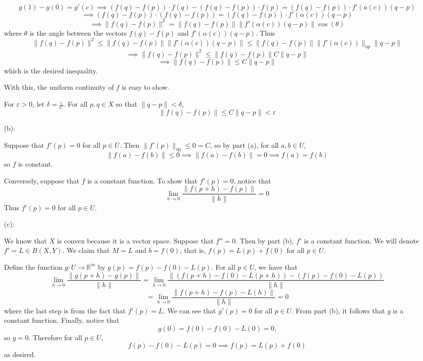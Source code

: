 \documentclass{article}
\newcommand{\op}{\mathrm{op}}
\theoremstyle{plain} %
\numberwithin{thm}{section} %
\theoremstyle{definition}
\begin{document}
\begin{question}{25}
    \[
        g(1) - g(0) = g'(c) \implies (f(q) - f(p)) \cdot f(q) - (f(q) - f(p)) \cdot f(p) = (f(q) - f(p)) \cdot f'(a(c))(q-p)
    \]
    \[
        \implies (f(q) - f(p)) \cdot (f(q) - f(p)) = (f(q) - f(p)) \cdot f'(\alpha(c))(q-p)
    \]
    \[
        \implies \|f(q) - f(p)\|^2 = \|f(q) - f(p)\| \|f'(\alpha (c))(q-p)\| \cos (\theta)
    \]
    where \(\theta\) is the angle between the vectors \(f(q) - f(p)\) and \(f'(\alpha (c))(q-p)\). Thus
    \[
        \|f(q) - f(p)\|^2 \leq \|f(q) - f(p)\| \|f'(\alpha (c))(q-p)\| \leq \|f(q) - f(p)\| \|f'(\alpha (c))\| _{\op} \|q-p\|
    \]
    \[
        \implies \|f(q) - f(p)\|^2 \leq \|f(q) - f(p)\| C \|q-p\|
    \]
    \[
        \implies \|f(q) - f(p)\| \leq C \|q-p\|
    \]
    which is the desired inequality.

    With this, the uniform continuity of \(f\) is easy to show.

    For \(\varepsilon > 0\), let \(\delta = \frac{\varepsilon}{C}\). For all \(p,q \in X\) so that \(\|q-p\| <\delta \),
    \[
        \|f(q) - f(p)\| \leq C \|q-p\| < \varepsilon
    \]

    (b):
    
    Suppose that \(f'(p) = 0\) for all \(p \in U\). Then \(\|f'(p)\| _{\op} \leq 0 = C\), so by part (a), for all \(a,b \in U\),
    \[
        \|f(a) - f(b)\| \leq 0 \implies \|f(a) - f(b)\| = 0 \implies f(a) = f(b)
    \]
    so \(f\) is constant.

    Conversely, suppose that \(f\) is a constant function. To show that \(f'(p) = 0\), notice that
    \[
        \lim_{h \to 0} \frac{\|f(p + h) - f(p)\|}{\|h\|} = 0
    \]
    Thus \(f'(p) = 0\) for all \(p \in U\).

    (c):

    We know that \(X\) is convex because it is a vector space. Suppose that \(f'' = 0\). Then by part (b), \(f'\) is a constant function. We will denote \(f' = L \in B(X,Y)\). We claim that \(M = L\) and \(b = f(0)\), that is, \(f(p) = L(p) + f(0)\) for all \(p \in U\).

    Define the function \(g: U \to \mathbb{R}^m\) by \(g(p) = f(p) - f(0) - L(p)\). For all \(p \in U\), we have that
    \[
        \lim_{h \to 0} \frac{\|g(p + h) - g(p)\|}{\|h\|} = \lim_{h \to 0} \frac{\|(f(p+h) - f(0) - L(p+h)) - (f(p) - f(0) - L(p))}{\|h\|}
    \]
    \[
        = \lim_{h \to 0} \frac{\|f(p+h) - f(p) - L(h)\|}{\|h\|} = 0
    \]
    where the last step is from the fact that \(f'(p) = L\). We can see that \(g'(p) = 0\) for all \(p \in U\). From part (b), it follows that \(g\) is a constant function. Finally, notice that
    \[
        g(0) = f(0) - f(0) - L(0) = 0 \text{,} 
    \]
    so \(g = 0\). Therefore for all \(p \in U\),
    \[
        f(p) - f(0) - L(p) = 0 \implies f(p) = L(p) + f(0)
    \]
    as desired.


\end{question}
\end{document}
